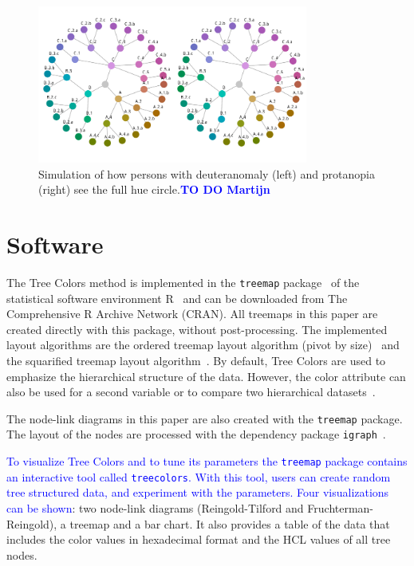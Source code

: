 \documentclass[journal]{vgtc}                %
\newcommand{\M}{\textcolor{blue}{\textbf{TO DO Martijn}}}
\newcommand{\changedM}[1]{\textcolor{blue}{#1}}
\begin{document}
\begin{figure}[tb]
  \centering
 \includegraphics[width=3.5in]{HCPgraph2.pdf}
  \caption{Simulation of how persons with deuteranomaly (left) and protanopia (right) see the full hue circle.\M}\label{fig:colblind}
\end{figure}


\section{Software}

The Tree Colors method is implemented in the \texttt{treemap} package~\cite{treemap} of the statistical software environment R~\cite{r2013} and can be downloaded from The Comprehensive R Archive Network (CRAN). All treemaps in this paper are created directly with this package, without post-processing. The implemented layout algorithms are the ordered treemap layout algorithm (pivot by size)~\cite{Bederson2002} and the squarified treemap layout algorithm~\cite{bruls99}. By default, Tree Colors are used to emphasize the hierarchical structure of the data. However, the color attribute can also be used for a second variable or to compare two hierarchical datasets~\cite{tennekes2011b}. 

The node-link diagrams in this paper are also created with the \texttt{treemap} package. The layout of the nodes are processed with the dependency package \texttt{igraph}~\cite{igraph}.

\changedM{To visualize Tree Colors and to tune its parameters the \texttt{treemap} package contains an interactive tool called \texttt{treecolors}. With this tool, users can create random tree structured data, and experiment with the parameters. Four visualizations can be shown}: two node-link diagrams (Reingold-Tilford and Fruchterman-Reingold), a treemap and a bar chart. It also provides a table of the data that includes the color values in hexadecimal format and the HCL values of all tree nodes.
\end{document}
